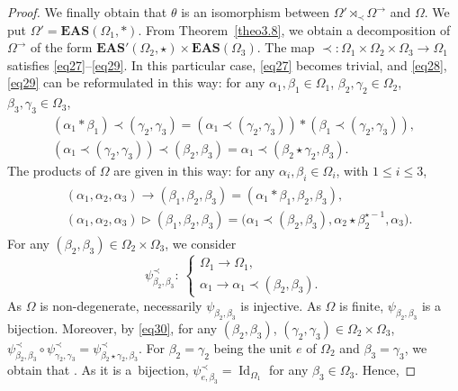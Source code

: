 \documentclass[pdftex]{sigma}
\numberwithin{equation}{section}
\newcommand{\eas}{\mathbf{EAS}}
\begin{document}
\begin{proof}
We finally obtain that $\theta$ is an isomorphism between $\Omega'\rtimes_\prec \Omega^\rightarrow$ and $\Omega$. We put $\Omega'=\eas(\Omega_1,*)$.
From Theorem~\ref{theo3.8}, we obtain a decomposition of $\Omega^\rightarrow$ of the form $\eas'(\Omega_2,\star)\times \eas(\Omega_3)$.
The map $\prec\colon\Omega_1\times \Omega_2\times \Omega_3\longrightarrow \Omega_1$ satisfies \eqref{eq27}--\eqref{eq29}. In this particular case, \eqref{eq27} becomes trivial, and \eqref{eq28}, \eqref{eq29} can be reformulated in this way:
for any $\alpha_1,\beta_1\in \Omega_1$, $\beta_2,\gamma_2\in \Omega_2$, $\beta_3,\gamma_3\in \Omega_3$,
\begin{gather*}
(\alpha_1*\beta_1)\prec(\gamma_2,\gamma_3)=(\alpha_1\prec (\gamma_2,\gamma_3))*(\beta_1\prec (\gamma_2,\gamma_3)),\\
(\alpha_1\prec (\gamma_2,\gamma_3))\prec(\beta_2,\beta_3)=\alpha_1\prec (\beta_2\star \gamma_2,\beta_3).
\end{gather*}
The products of $\Omega$ are given in this way: for any $\alpha_i,\beta_i\in \Omega_i$, with $1\leqslant i\leqslant 3$,
\begin{gather*}
\begin{split}
& (\alpha_1,\alpha_2,\alpha_3)\rightarrow(\beta_1,\beta_2,\beta_3)=(\alpha_1*\beta_1,\beta_2,\beta_3),\\
& (\alpha_1,\alpha_2,\alpha_3)\triangleright(\beta_1,\beta_2,\beta_3)=\bigl(\alpha_1\prec (\beta_2,\beta_3),\alpha_2\star \beta_2^{\star-1},\alpha_3\bigr).
\end{split}
\end{gather*}
For any $(\beta_2,\beta_3)\in \Omega_2\times \Omega_3$, we consider
\[\psi^\prec_{\beta_2,\beta_3}\colon \ \begin{cases}
\Omega_1 \longrightarrow \Omega_1,\\
\alpha_1 \longrightarrow \alpha_1\prec (\beta_2,\beta_3).
\end{cases}\]
As $\Omega$ is non-degenerate, necessarily $\psi_{\beta_2,\beta_3}$ is injective. As $\Omega$ is finite, $\psi_{\beta_2,\beta_3}$ is a bijection.
Moreover, by \eqref{eq30}, for any $(\beta_2,\beta_3)$, $(\gamma_2,\gamma_3)\in \Omega_2\times \Omega_3$,
$\psi^\prec_{\beta_2,\beta_3}\circ \psi^\prec_{\gamma_2,\gamma_3}=\psi^\prec_{\beta_2\star \gamma_2,\beta_3}$.
For $\beta_2=\gamma_2$ being the unit $e$ of $\Omega_2$ and $\beta_3=\gamma_3$, we obtain that .
As it is a~bijection, $\psi^\prec_{e,\beta_3}=\operatorname{Id}_{\Omega_1}$ for any $\beta_3\in \Omega_3$. Hence,

\end{proof}
\end{document}
